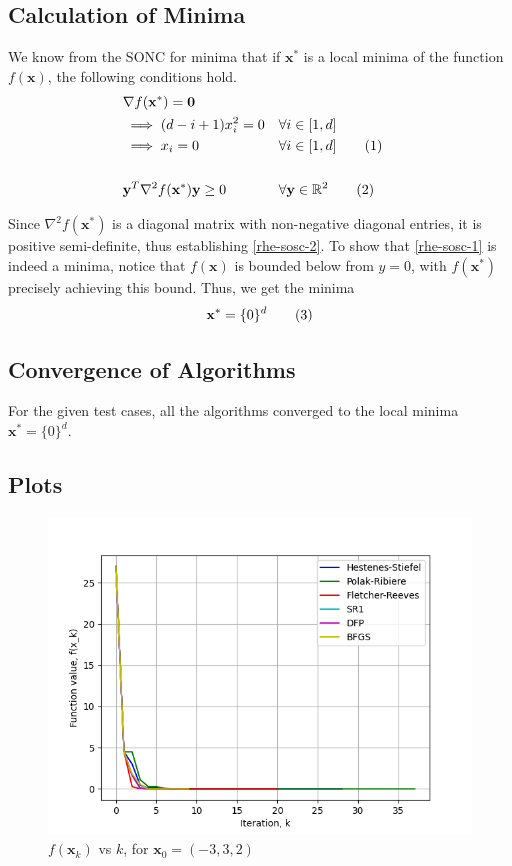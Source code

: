 \documentclass[a4paper]{article}
\newcommand\numberthis{\addtocounter{equation}{1}\tag{\theequation}}
\begin{document}
\subsection{Calculation of Minima}

We know from the SONC for minima that if $\textbf{x}^*$ is a local minima of the function $f(\textbf{x})$, the following conditions hold.
\begin{align*}
&\nabla f(\textbf{x}^*) = \textbf{0} \\
&\implies (d - i + 1) x_i^2 = 0 &&\forall i \in [1, d] \\
&\implies x_i = 0 &&\forall i \in [1, d] \numberthis \label{rhe-sosc-1} \\ \\
&\textbf{y}^T \nabla^2 f(\textbf{x}^*) \textbf{y} \geq 0 &&\forall \textbf{y} \in \mathbb{R}^2 \numberthis \label{rhe-sosc-2}
\end{align*}

Since $\nabla^2 f(\textbf{x}^*)$ is a diagonal matrix with non-negative diagonal entries, it is positive semi-definite, thus establishing \eqref{rhe-sosc-2}. To show that \eqref{rhe-sosc-1} is indeed a minima, notice that $f(\textbf{x})$ is bounded below from $y = 0$, with $f(\textbf{x}^*)$ precisely achieving this bound. Thus, we get the minima
\begin{align*}
\textbf{x}^* = \{0\}^d \numberthis \label{rhe-minima}
\end{align*}

\subsection{Convergence of Algorithms}

For the given test cases, all the algorithms converged to the local minima $\textbf{x}^* = \{0\}^d$.

\subsection{Plots}

\begin{figure}[H]
    \centering
    \includegraphics[width=.65\textwidth]{hyperellipsoid_function_vals.png}
    \caption{$f(\textbf{x}_k)$ vs $k$, for $\textbf{x}_0 = (-3, 3, 2)$}
\end{figure}
\end{document}
